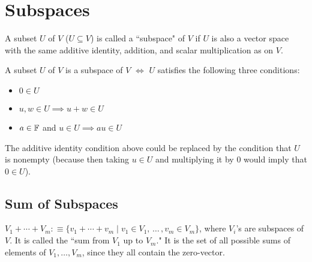 \section{Subspaces}

\begin{mydef}
  A subset $U$ of $V$ ($U \subseteq V$) is called a ``subspace" of $V$ if $U$ is also a vector space with the same additive identity, addition, and scalar multiplication as on $V$.
\end{mydef}

\begin{thm}
  A subset $U$ of $V$ is a subspace of $V$ $\iff$ $U$ satisfies the following three conditions:
  \begin{itemize}
    \item {}
    $0 \in U$
    \item {}
    $u,w \in U \implies u+w \in U$
    \item {}
    $a \in \mathbb{F}$ and $u \in U \implies au \in U$
  \end{itemize}
  The additive identity condition above could be replaced by the condition that $U$ is nonempty (because then taking $u \in U$ and multiplying it by $0$ would imply that $0\in U$).
\end{thm}



\subsection{Sum of Subspaces}

\setcounter{thm}{35}

\begin{mydef}
  $V_1 + \cdots + V_m :\equiv \{v_1 + \cdots + v_m \mid v_1 \in V_1, \, \dots \, , v_m \in V_m \}$, where $V_i$'s are subspaces of $V$. It is called the ``sum from $V_1$ up to $V_m$." It is the set of all possible sums of elements of $V_1, \ldots, V_m$, since they all contain the zero-vector.
\end{mydef}

